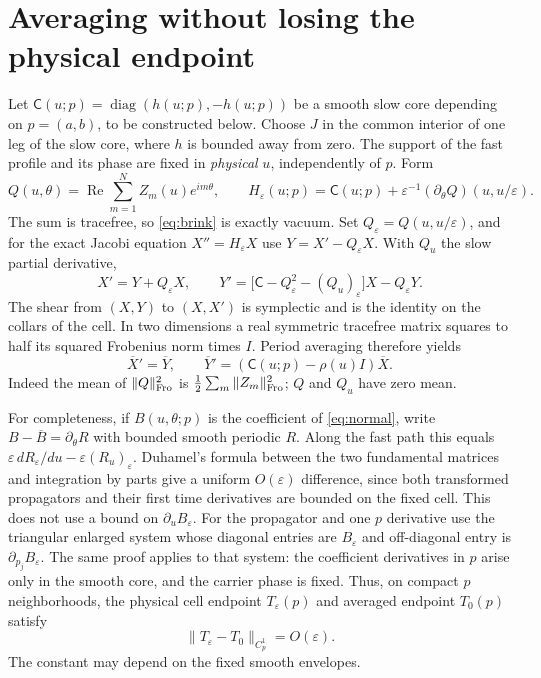 \documentclass[11pt]{article}
\newcommand{\diag}{\operatorname{diag}}
\newcommand{\Rea}{\operatorname{Re}}
\begin{document}
\section{Averaging without losing the physical endpoint}
Let \(\mathsf C(u;p)=\diag(h(u;p),-h(u;p))\) be a smooth slow core depending on \(p=(a,b)\), to be constructed below. Choose \(J\) in the common interior of one leg of the slow core, where \(h\) is bounded away from zero. The support of the fast profile and its phase are fixed in \emph{physical} \(u\), independently of \(p\). Form
\[
 Q(u,\theta)=\Rea\sum_{m=1}^N Z_m(u)e^{im\theta},
 \qquad
 H_\varepsilon(u;p)=\mathsf C(u;p)
      +\varepsilon^{-1}(\partial_\theta Q)(u,u/\varepsilon).
\]
The sum is tracefree, so \eqref{eq:brink} is exactly vacuum. Set \(Q_\varepsilon=Q(u,u/\varepsilon)\), and for the exact Jacobi equation \(X''=H_\varepsilon X\) use \(Y=X'-Q_\varepsilon X\). With \(Q_u\) the slow partial derivative,
\begin{equation}\label{eq:normal}
 X'=Y+Q_\varepsilon X,\qquad
 Y'=\bigl[\mathsf C-Q_\varepsilon^2-(Q_u)_\varepsilon\bigr]X-Q_\varepsilon Y.
\end{equation}
The shear from \((X,Y)\) to \((X,X')\) is symplectic and is the identity on the collars of the cell. In two dimensions a real symmetric tracefree matrix squares to half its squared Frobenius norm times \(I\). Period averaging therefore yields
\begin{equation}\label{eq:avg}
 \overline X'=\overline Y,\qquad
 \overline Y'=(\mathsf C(u;p)-\rho(u)I)\overline X .
\end{equation}
Indeed the mean of \(\|Q\|_{\rm Fro}^2\) is \(\frac12\sum_m\|Z_m\|^2_{\rm Fro}\); \(Q\) and \(Q_u\) have zero mean.

For completeness, if \(B(u,\theta;p)\) is the coefficient of \eqref{eq:normal}, write \(B-\overline B=\partial_\theta R\) with bounded smooth periodic \(R\). Along the fast path this equals
\(\varepsilon\,dR_\varepsilon/du-\varepsilon(R_u)_\varepsilon\).
Duhamel's formula between the two fundamental matrices and integration by parts give a uniform \(O(\varepsilon)\) difference, since both transformed propagators and their first time derivatives are bounded on the fixed cell. This does not use a bound on \(\partial_u B_\varepsilon\). For the propagator and one \(p\) derivative use the triangular enlarged system whose diagonal entries are \(B_\varepsilon\) and off-diagonal entry is \(\partial_{p_j}B_\varepsilon\). The same proof applies to that system: the coefficient derivatives in \(p\) arise only in the smooth core, and the carrier phase is fixed. Thus, on compact \(p\) neighborhoods, the physical cell endpoint \(T_\varepsilon(p)\) and averaged endpoint \(T_0(p)\) satisfy
\begin{equation}\label{eq:c1}
 \|T_\varepsilon-T_0\|_{C^1_p}=O(\varepsilon).
\end{equation}
The constant may depend on the fixed smooth envelopes.
\end{document}
